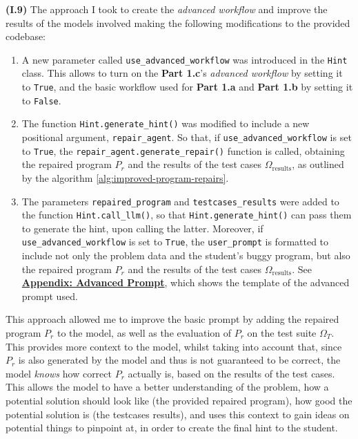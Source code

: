 \documentclass{article}
\begin{document}

\textbf{(I.9)} The approach I took to create the \textit{advanced workflow} and improve the results of the models involved making the following modifications to the provided codebase:

\begin{enumerate}
    \item A new parameter called \texttt{use\_advanced\_workflow} was introduced in the \texttt{Hint} class. This allows to turn on the \textbf{Part 1.c}'s \textit{advanced workflow} by setting it to \texttt{True}, and the basic workflow used for \textbf{Part 1.a} and \textbf{Part 1.b} by setting it to \texttt{False}.
    \item The function \texttt{Hint.generate\_hint()} was modified to include a new positional argument, \texttt{repair\_agent}. So that, if \texttt{use\_advanced\_workflow} is set to \texttt{True}, the \texttt{repair\_agent.generate\_repair()} function is called, obtaining the repaired program $P_r$ and the results of the test cases $\Omega_{\text{results}}$, as outlined by the algorithm \ref{alg:improved-program-repairs}. 
    \item The parameters \texttt{repaired\_program} and \texttt{testcases\_results} were added to the function \texttt{Hint.call\_llm()}, so that \texttt{Hint.generate\_hint()} can pass them to generate the hint, upon calling the latter. Moreover, if \texttt{use\_advanced\_workflow} is set to \texttt{True}, the \texttt{user\_prompt} is formatted to include not only the problem data and the student's buggy program, but also the repaired program $P_r$ and the results of the test cases $\Omega_{\text{results}}$. See \hyperref[appendix:advanced-prompt]{\textbf{Appendix: Advanced Prompt}}, which shows the template of the advanced prompt used.
\end{enumerate}

This approach allowed me to improve the basic prompt by adding the repaired program $P_r$ to the model, as well as the evaluation of $P_r$ on the test suite $\Omega_T$. This provides more context to the model, whilst taking into account that, since $P_r$ is also generated by the model and thus is not guaranteed to be correct, the model \textit{knows} how correct $P_r$ actually is, based on the results of the test cases. This allows the model to have a better understanding of the problem, how a potential solution should look like (the provided repaired program), how good the potential solution is (the testcases results), and uses this context to gain ideas on potential things to pinpoint at, in order to create the final hint to the student.
\end{document}

